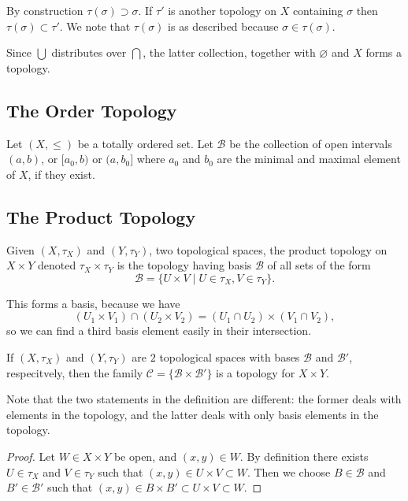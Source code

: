 By construction $\tau(\sigma) \supset \sigma$. If $\tau'$ is another topology on $X$ containing $\sigma$ then $\tau(\sigma) \subset \tau'$. We note that $\tau(\sigma)$ is as described because $\sigma \in \tau(\sigma)$.

Since $\bigcup$ distributes over $\bigcap$, the latter collection, together with $\varnothing$ and $X$ forms a topology.

\subsection{The Order Topology}

Let $(X, \leq)$ be a totally ordered set. Let $\mathcal{B}$ be the collection of open intervals $(a, b)$, or $[a_0,b)$ or $(a, b_0]$ where $a_0$ and $b_0$ are the minimal and maximal element of $X$, if they exist.

\subsection{The Product Topology}

Given $(X, \tau_X)$ and $(Y, \tau_Y)$, two topological spaces, the product topology on $X \times Y$ denoted $\tau_X \times \tau_Y$ is the topology having basis $\mathcal{B}$ of all sets of the form
\[\mathcal{B} = \{U \times V \mid U \in \tau_X, V \in \tau_Y\}.\]

This forms a basis, because we have
\[(U_1 \times V_1) \cap (U_2 \times V_2) = (U_1 \cap U_2) \times (V_1 \cap V_2),\] so we can find a third basis element easily in their intersection.

\begin{proposition}
If $(X, \tau_X)$ and $(Y, \tau_Y)$ are $2$ topological spaces with bases $\mathcal{B}$ and $\mathcal{B}'$, respecitvely, then the family $\mathcal{C} = \{\mathcal{B} \times \mathcal{B}'\}$ is a topology for $X \times Y$. 
\end{proposition}

Note that the two statements in the definition are different: the former deals with elements in the topology, and the latter deals with only basis elements in the topology. 

\begin{proof}
Let $W \in X \times Y$ be open, and $(x, y) \in W$. By definition there exists $U \in \tau_X$ and $V \in \tau_Y$ such that $(x, y) \in U \times V \subset W$. Then we choose $B \in \mathcal{B}$ and $B' \in \mathcal{B}'$ such that $(x, y) \in B \times B' \subset U \times V \subset W$.
\end{proof}

